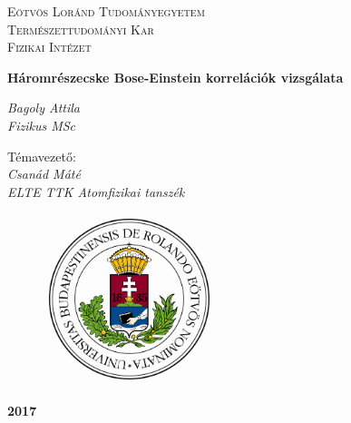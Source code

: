 \documentclass[10pt,a4paper]{article}
\title{}
\numberwithin{equation}{subsection}
\numberwithin{figure}{section}
\begin{document}
\pagestyle{empty}


\begin{titlepage}

\center

\textsc{\LARGE  Eötvös Loránd Tudományegyetem}\\[0.5cm]
\textsc{\LARGE Természettudományi Kar}\\[0.5cm]
\textsc{\LARGE Fizikai Intézet}\\[1.5cm]
\vspace{8mm}

{ \huge \bfseries Háromrészecske Bose-Einstein korrelációk vizsgálata}\\[0.4cm] %
\vspace{8mm}

\begin{center}
\LARGE \textit{Bagoly Attila}\\
\Large \textit{Fizikus MSc}\\
\end{center}

\begin{center}
\LARGE Témavezető: \\
\LARGE \textit{Csanád Máté}\\
\Large \textit{ELTE TTK Atomfizikai tanszék}\\
\end{center}
\vspace{4mm}



\begin{figure}[H] 
\centerline{ 
\includegraphics[height=5cm]{pic/ELTE_logo.png} 
} 
\end{figure}
\vspace{5mm}
\begin{Large}
\textbf{2017%
}
\end{Large}


\end{titlepage}
\end{document}
